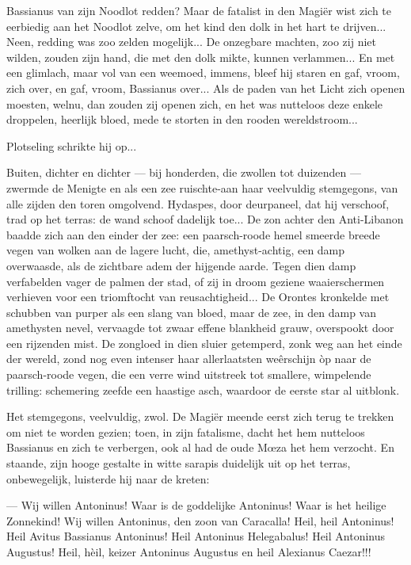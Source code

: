 \documentclass[a4paper, 12pt, oneside, dutch]{article}
\begin{document}
Bassianus van zijn Noodlot redden? Maar de fatalist in den Magiër wist zich te eerbiedig aan het Noodlot zelve, om het kind den dolk in het hart te drijven... Neen, redding was zoo zelden mogelijk... De onzegbare machten, zoo zij niet wilden, zouden zijn hand, die met den dolk mikte, kunnen verlammen... En met een glimlach, maar vol van een weemoed, immens, bleef hij staren en gaf, vroom, zich over, en gaf, vroom, Bassianus over... Als de paden van het Licht zich openen moesten, welnu, dan zouden zij openen zich, en het was nutteloos deze enkele droppelen, heerlijk bloed, mede te storten in den rooden wereldstroom...

Plotseling schrikte hij op...

Buiten, dichter en dichter --- bij honderden, die zwollen tot duizenden --- zwermde de Menigte en als een zee ruischte-aan haar veelvuldig stemgegons, van alle zijden den toren omgolvend. Hydaspes, door deurpaneel, dat hij verschoof, trad op het terras: de wand schoof dadelijk toe... De zon achter den Anti-Libanon baadde zich aan den einder der zee: een paarsch-roode hemel smeerde breede vegen van wolken aan de lagere lucht, die, amethyst-achtig, een damp overwaasde, als de zichtbare adem der hijgende aarde. Tegen dien damp verfabelden vager de palmen der stad, of zij in droom geziene waaierschermen verhieven voor een triomftocht van reusachtigheid... De Orontes kronkelde met schubben van purper als een slang van bloed, maar de zee, in den damp van amethysten nevel, vervaagde tot zwaar effene blankheid grauw, overspookt door een rijzenden mist. De zongloed in dien sluier getemperd, zonk weg aan het einde der wereld, zond nog even intenser haar allerlaatsten weêrschijn òp naar de paarsch-roode vegen, die een verre wind uitstreek tot smallere, wimpelende trilling: schemering zeefde een haastige asch, waardoor de eerste star al uitblonk.

Het stemgegons, veelvuldig, zwol. De Magiër meende eerst zich terug te trekken om niet te worden gezien; toen, in zijn fatalisme, dacht het hem nutteloos Bassianus en zich te verbergen, ook al had de oude Mœza het hem verzocht. En staande, zijn hooge gestalte in witte sarapis duidelijk uit op het terras, onbewegelijk, luisterde hij naar de kreten:

--- Wij willen Antoninus! Waar is de goddelijke Antoninus! Waar is het heilige Zonnekind! Wij willen Antoninus, den zoon van Caracalla! Heil, heil Antoninus! Heil Avitus Bassianus Antoninus! Heil Antoninus Helegabalus! Heil Antoninus Augustus! Heil, hèil, keizer Antoninus Augustus en heil Alexianus Caezar!!!
\end{document}
